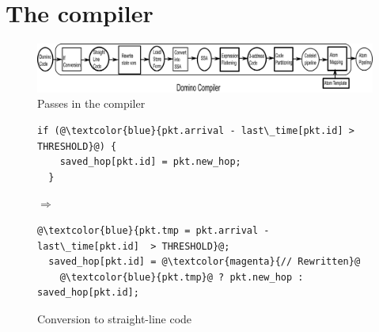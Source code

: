 \section{The \pktlanguage compiler}






\label{s:compiler}

\begin{figure}[!t]
  \includegraphics[width=\textwidth]{compiler.pdf}
  \caption{Passes in the \pktlanguage compiler}
  \label{fig:passes}
\end{figure}

\begin{figure}[!t]
  \hspace{-0.3in}
  \begin{minipage}{0.55\textwidth}
  \begin{small}
  \begin{lstlisting}[style=customc, numbers=none, frame=none]
  if (@\textcolor{blue}{pkt.arrival - last\_time[pkt.id] > THRESHOLD}@) {
    saved_hop[pkt.id] = pkt.new_hop;
  }
  \end{lstlisting}
  \end{small}
  \end{minipage}
%  
  \hspace{-0.5in}
  $\Longrightarrow$ 
  \hspace{-0.3in}
%  
  \begin{minipage}{0.6\textwidth}
  \begin{small}
  \begin{lstlisting}[style=customc, numbers=none, frame=none]
  @\textcolor{blue}{pkt.tmp = pkt.arrival - last\_time[pkt.id]  > THRESHOLD}@;
  saved_hop[pkt.id] = @\textcolor{magenta}{// Rewritten}@
    @\textcolor{blue}{pkt.tmp}@ ? pkt.new_hop : saved_hop[pkt.id];
  \end{lstlisting}
  \end{small}
  \end{minipage}
\vspace{-.2in}
\caption{Conversion to straight-line code}
\label{fig:if_convert}
\end{figure}

